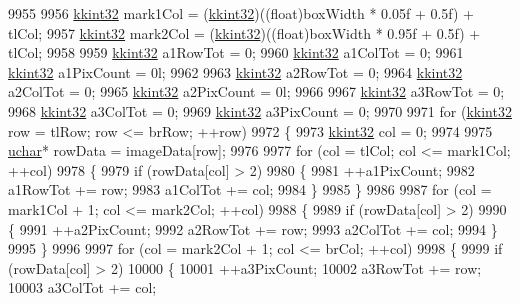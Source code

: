 \begin{DoxyCode}
9955 
9956     \hyperlink{namespace_k_k_b_a8fa4952cc84fda1de4bec1fbdd8d5b1b}{kkint32}  mark1Col = (\hyperlink{namespace_k_k_b_a8fa4952cc84fda1de4bec1fbdd8d5b1b}{kkint32})((\textcolor{keywordtype}{float})boxWidth * 0.05f + 0.5f) + tlCol;
9957     \hyperlink{namespace_k_k_b_a8fa4952cc84fda1de4bec1fbdd8d5b1b}{kkint32}  mark2Col = (\hyperlink{namespace_k_k_b_a8fa4952cc84fda1de4bec1fbdd8d5b1b}{kkint32})((\textcolor{keywordtype}{float})boxWidth * 0.95f + 0.5f) + tlCol;
9958 
9959     \hyperlink{namespace_k_k_b_a8fa4952cc84fda1de4bec1fbdd8d5b1b}{kkint32}  a1RowTot   = 0;
9960     \hyperlink{namespace_k_k_b_a8fa4952cc84fda1de4bec1fbdd8d5b1b}{kkint32}  a1ColTot   = 0;
9961     \hyperlink{namespace_k_k_b_a8fa4952cc84fda1de4bec1fbdd8d5b1b}{kkint32}  a1PixCount = 0l;
9962 
9963     \hyperlink{namespace_k_k_b_a8fa4952cc84fda1de4bec1fbdd8d5b1b}{kkint32}  a2RowTot   = 0;
9964     \hyperlink{namespace_k_k_b_a8fa4952cc84fda1de4bec1fbdd8d5b1b}{kkint32}  a2ColTot   = 0;
9965     \hyperlink{namespace_k_k_b_a8fa4952cc84fda1de4bec1fbdd8d5b1b}{kkint32}  a2PixCount = 0l;
9966 
9967     \hyperlink{namespace_k_k_b_a8fa4952cc84fda1de4bec1fbdd8d5b1b}{kkint32}  a3RowTot   = 0;
9968     \hyperlink{namespace_k_k_b_a8fa4952cc84fda1de4bec1fbdd8d5b1b}{kkint32}  a3ColTot   = 0;
9969     \hyperlink{namespace_k_k_b_a8fa4952cc84fda1de4bec1fbdd8d5b1b}{kkint32}  a3PixCount = 0;
9970 
9971     \textcolor{keywordflow}{for}  (\hyperlink{namespace_k_k_b_a8fa4952cc84fda1de4bec1fbdd8d5b1b}{kkint32} row = tlRow;  row <= brRow;  ++row)
9972     \{
9973       \hyperlink{namespace_k_k_b_a8fa4952cc84fda1de4bec1fbdd8d5b1b}{kkint32} col = 0;
9974 
9975       \hyperlink{namespace_k_k_b_ace9969169bf514f9ee6185186949cdf7}{uchar}*  rowData = imageData[row];
9976 
9977       \textcolor{keywordflow}{for}  (col = tlCol;  col <= mark1Col;  ++col)
9978       \{
9979         \textcolor{keywordflow}{if}  (rowData[col] > 2)
9980         \{
9981           ++a1PixCount;
9982           a1RowTot += row;
9983           a1ColTot += col;
9984         \}
9985       \}
9986 
9987       \textcolor{keywordflow}{for}  (col = mark1Col + 1;  col <= mark2Col;  ++col)
9988       \{
9989         \textcolor{keywordflow}{if}  (rowData[col] > 2)
9990         \{
9991           ++a2PixCount;
9992           a2RowTot += row;
9993           a2ColTot += col;
9994         \}
9995       \}
9996 
9997       \textcolor{keywordflow}{for}  (col = mark2Col + 1;  col <= brCol;  ++col)
9998       \{
9999         \textcolor{keywordflow}{if}  (rowData[col] > 2)
10000         \{
10001           ++a3PixCount;
10002           a3RowTot += row;
10003           a3ColTot += col;

\end{DoxyCode}
